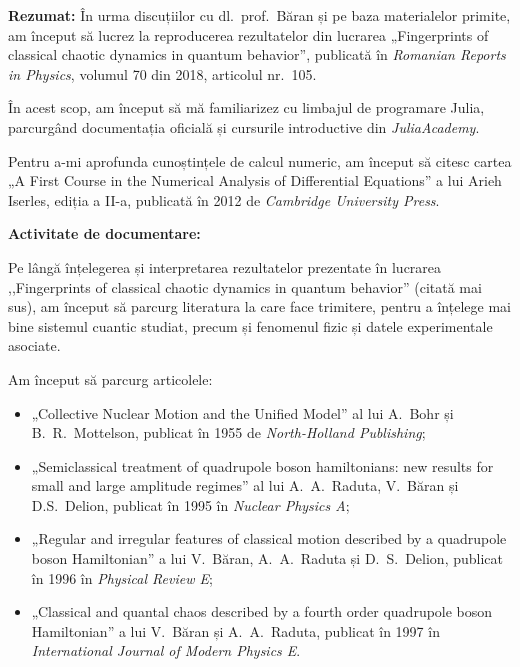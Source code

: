 
\makereportpreamble

\textbf{Rezumat:} În urma discuțiilor cu dl.~prof.~Băran și pe baza materialelor primite, am început să lucrez la reproducerea rezultatelor din lucrarea „Fingerprints of classical chaotic dynamics in quantum behavior”, publicată în \textit{Romanian Reports in Physics}, volumul 70 din 2018, articolul nr.~105.

În acest scop, am început să mă familiarizez cu limbajul de programare Julia, parcurgând documentația oficială și cursurile introductive din \textit{JuliaAcademy}.

Pentru a-mi aprofunda cunoștințele de calcul numeric, am început să citesc cartea „A First Course in the Numerical Analysis of Differential Equations” a lui Arieh Iserles, ediția a II-a, publicată în 2012 de \textit{Cambridge University Press}.

\vspace{0.5em}

\textbf{Activitate de documentare:}

Pe lângă înțelegerea și interpretarea rezultatelor prezentate în lucrarea ,,Fingerprints of classical chaotic dynamics in quantum behavior'' (citată mai sus), am început să parcurg literatura la care face trimitere, pentru a înțelege mai bine sistemul cuantic studiat, precum și fenomenul fizic și datele experimentale asociate.
    
Am început să parcurg articolele:
\begin{itemize}
    \item „Collective Nuclear Motion and the Unified Model” al lui A.~Bohr și B.~R.~Mottelson, publicat în 1955 de \textit{North-Holland Publishing};
    \item „Semiclassical treatment of quadrupole boson hamiltonians: new results for small and large amplitude regimes” al lui A.~A.~Raduta, V.~Băran și D.S.~Delion, publicat în 1995 în \textit{Nuclear Physics A};
    \item „Regular and irregular features of classical motion described by a quadrupole boson Hamiltonian” a lui V.~Băran, A.~A.~Raduta și D.~S.~Delion, publicat în 1996 în \textit{Physical Review E};
    \item „Classical and quantal chaos described by a fourth order quadrupole boson Hamiltonian” a lui V.~Băran și A.~A.~Raduta, publicat în 1997 în \textit{International Journal of Modern Physics E}.
\end{itemize}

